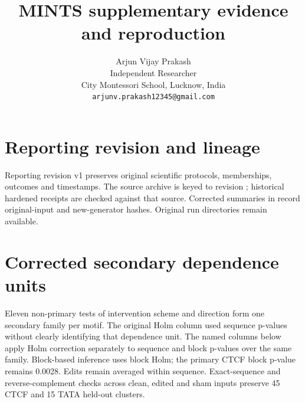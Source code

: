 \documentclass[10pt,letterpaper]{article}
\title{MINTS supplementary evidence and reproduction}\author{Arjun Vijay Prakash\\Independent Researcher\\City Montessori School, Lucknow, India\\\texttt{arjunv.prakash12345@gmail.com}}\date{}
\begin{document}
\maketitle
\section{Reporting revision and lineage}
Reporting revision v1 preserves original scientific protocols, memberships, outcomes and timestamps. The source archive is keyed to revision ; historical hardened receipts are checked against that source. Corrected summaries in  record original-input and new-generator hashes. Original run directories remain available.
\section{Corrected secondary dependence units}
Eleven non-primary tests of intervention scheme and direction form one secondary family per motif. The original Holm column used sequence p-values without clearly identifying that dependence unit. The named columns below apply Holm correction separately to sequence and block p-values over the same family. Block-based inference uses block Holm; the primary CTCF block p-value remains 0.0028. Edits remain averaged within sequence. Exact-sequence and reverse-complement checks across clean, edited and sham inputs preserve 45 CTCF and 15 TATA held-out clusters.
\begin{table}[h]\centering\setlength{\tabcolsep}{4pt}\caption{Corrected secondary reporting from saved unadjusted p-values.}\end{table}\FloatBarrier
\end{document}
